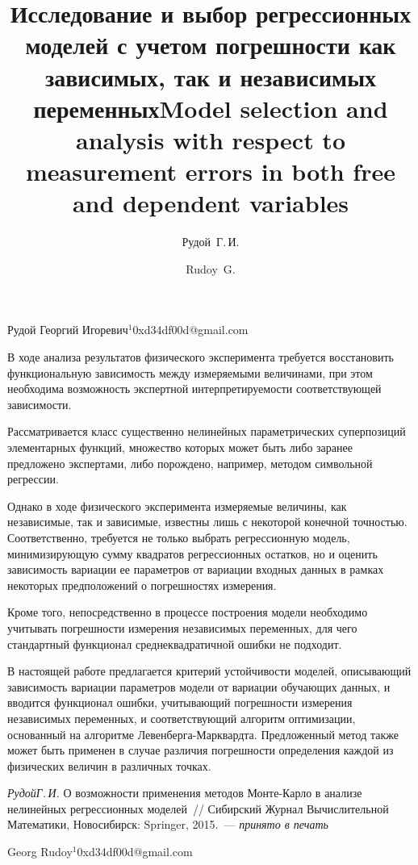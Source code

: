 \documentclass[twoside]{article}
\begin{document}
\Russian
\title{Исследование и выбор регрессионных моделей с учетом погрешности как зависимых, так и независимых переменных}
\author{Рудой~Г.\,И.}{Рудой Георгий Игоревич$^1$}{0xd34df00d@gmail.com}
\maketitle

В ходе анализа результатов физического эксперимента требуется восстановить
функциональную зависимость между измеряемыми величинами, при этом необходима
возможность экспертной интерпретируемости соответствующей зависимости.

Рассматривается класс существенно нелинейных параметрических
суперпозиций элементарных функций, множество которых может быть либо заранее
предложено экспертами, либо порождено, например, методом символьной регрессии.

Однако в ходе физического эксперимента измеряемые величины, как независимые,
так и зависимые, известны лишь с некоторой конечной точностью. Соответственно,
требуется не только выбрать регрессионную модель, минимизирующую сумму
квадратов регрессионных остатков, но и оценить зависимость вариации ее
параметров от вариации входных данных в рамках некоторых предположений
о погрешностях измерения.

Кроме того, непосредственно в процессе построения модели необходимо учитывать
погрешности измерения независимых переменных, для чего стандартный функционал
среднеквадратичной ошибки не подходит.

В настоящей работе предлагается критерий устойчивости моделей, описывающий
зависимость вариации параметров модели от вариации обучающих данных,
и вводится функционал ошибки, учитывающий погрешности
измерения независимых переменных, и соответствующий алгоритм оптимизации,
основанный на алгоритме Левенберга-Марквардта. Предложенный метод также
может быть применен в случае различия погрешности определения каждой из
физических величин в различных точках.

\begin{thebibliography}{1}
    \emph{Рудой\;Г.\,И.}
    О возможности применения методов Монте-Карло в анализе нелинейных регрессионных моделей~//
    Сибирский Журнал Вычислительной Математики,
	Новосибирск: Springer, 2015.~--- \emph{принято в печать}
\end{thebibliography}

\English
\title{Model selection and analysis with respect to measurement errors in both free and dependent variables}
\author{Rudoy~G.}{Georg Rudoy$^1$}{0xd34df00d@gmail.com}
\maketitle
\end{document}
